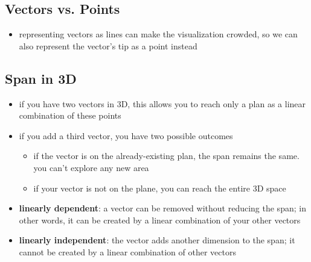 \subsection{Vectors vs. Points}
\begin{itemize}
    \item representing vectors as lines can make the visualization crowded, so we can also represent the vector's tip as a point instead
\end{itemize}

\subsection{Span in 3D}
\begin{itemize}
    \item if you have two vectors in 3D, this allows you to reach only a plan as a linear combination of these points
    \item if you add a third vector, you have two possible outcomes
    \begin{itemize}
        \item if the vector is on the already-existing plan, the span remains the same. you can't explore any new area
        \item if your vector is not on the plane, you can reach the entire 3D space
    \end{itemize}
    \item \textbf{linearly dependent}: a vector can be removed without reducing the span; in other words, it can be created by a linear combination of your other vectors
    \item \textbf{linearly independent}: the vector adds another dimension to the span;  it cannot be created by a linear combination of other vectors
\end{itemize}
